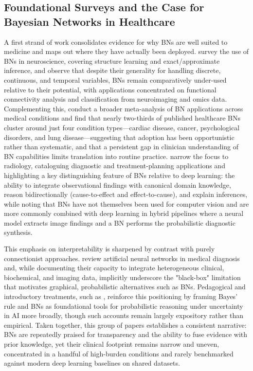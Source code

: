 \subsection{Foundational Surveys and the Case for Bayesian Networks in Healthcare}
A first strand of work consolidates evidence for why BNs are well suited to medicine and maps out where they have actually been deployed. \cite{bielza2014bayesian} survey the use of BNs in neuroscience, covering structure learning and exact/approximate inference, and observe that despite their generality for handling discrete, continuous, and temporal variables, BNs remain comparatively under-used relative to their potential, with applications concentrated on functional connectivity analysis and classification from neuroimaging and omics data. Complementing this, \cite{mclachlan2020bayesian} conduct a broader meta-analysis of BN applications across medical conditions and find that nearly two-thirds of published healthcare BNs cluster around just four condition types---cardiac disease, cancer, psychological disorders, and lung disease---suggesting that adoption has been opportunistic rather than systematic, and that a persistent gap in clinician understanding of BN capabilities limits translation into routine practice. \cite{ma2023bayesian} narrow the focus to radiology, cataloguing diagnostic and treatment-planning applications and highlighting a key distinguishing feature of BNs relative to deep learning: the ability to integrate observational findings with canonical domain knowledge, reason bidirectionally (cause-to-effect and effect-to-cause), and explain inferences, while noting that BNs have not themselves been used for computer vision and are more commonly combined with deep learning in hybrid pipelines where a neural model extracts image findings and a BN performs the probabilistic diagnostic synthesis.

This emphasis on interpretability is sharpened by contrast with purely connectionist approaches. \cite{amato2013artificial} review artificial neural networks in medical diagnosis and, while documenting their capacity to integrate heterogeneous clinical, biochemical, and imaging data, implicitly underscore the "black-box" limitation that motivates graphical, probabilistic alternatives such as BNs. Pedagogical and introductory treatments, such as \cite{geetha2023understanding}, reinforce this positioning by framing Bayes' rule and BNs as foundational tools for probabilistic reasoning under uncertainty in AI more broadly, though such accounts remain largely expository rather than empirical. Taken together, this group of papers establishes a consistent narrative: BNs are repeatedly praised for transparency and the ability to fuse evidence with prior knowledge, yet their clinical footprint remains narrow and uneven, concentrated in a handful of high-burden conditions and rarely benchmarked against modern deep learning baselines on shared datasets.

